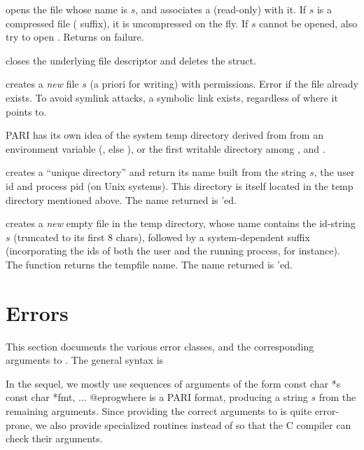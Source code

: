  opens the file whose name is
$s$,  and associates a (read-only)  with it. If $s$ is a
compressed file ( suffix), it is uncompressed on the fly.
If $s$ cannot be opened, also try to open . Returns 
on failure.

 closes
the underlying file descriptor and deletes the  struct.

creates a \emph{new} file $s$ (a priori for writing) with 
permissions. Error if the file already exists. To avoid symlink attacks,
a symbolic link exists, regardless of where it points to.


PARI has its own idea of the system temp directory derived from from an
environment variable (, else ), or the first
writable directory among ,  and .

 creates a ``unique directory''
and return its name built from the string $s$, the user id and process pid
(on Unix systems). This directory is itself located in the temp
directory mentioned above. The name returned is 'ed.

 creates a \emph{new} empty
file in the temp directory, whose name contains the id-string $s$ (truncated
to its first $8$ chars), followed by a system-dependent suffix (incorporating
the ids of both the user and the running process, for instance). The function
returns the tempfile name. The name returned is 'ed.

\section{Errors}\label{se:errors}

This section documents the various error classes, and the corresponding
arguments to . The general syntax is


\noindent In the sequel, we mostly use sequences of arguments of the form
\bprog
  const char *s
  const char *fmt, ...
@eprog\noindent where  is a PARI
format, producing a string $s$ from the remaining arguments. Since
providing the correct arguments to  is quite error-prone, we
also provide specialized routines 
instead of  so that the C compiler
can check their arguments.

